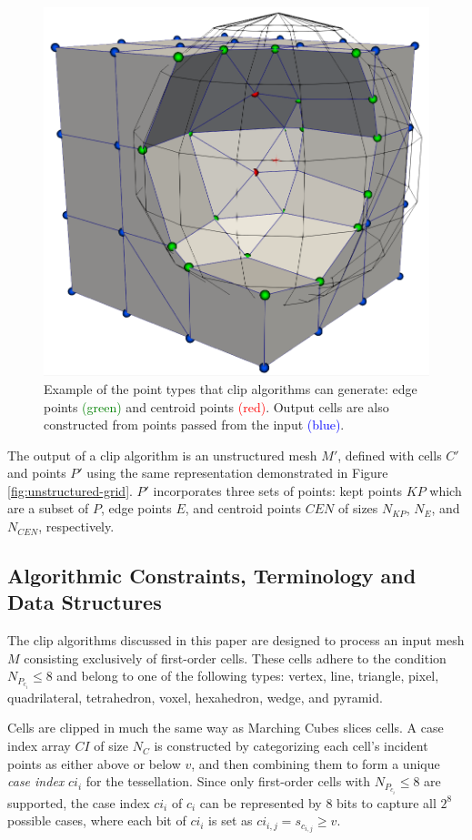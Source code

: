 \documentclass{egpubl}
\begin{document}
\begin{figure}[h]
    \centering
    \includegraphics[width=0.555\linewidth]{./Figures/Point-Types.png}
    \caption{Example of the point types that clip algorithms can generate: edge points \textcolor{green}{(green)} and centroid points \textcolor{red}{(red)}.
    Output cells are also constructed from points passed from the input \textcolor{blue}{(blue)}.}
    \label{fig:point-types}
\end{figure}

The output of a clip algorithm is an unstructured mesh $M'$, defined with cells $C'$ and points $P'$ using the same representation demonstrated in Figure \ref{fig:unstructured-grid}. $P'$ incorporates three sets of points: kept points $KP$ which are a subset of $P$, edge points $E$, and centroid points $CEN$ of sizes $N_{KP}$, $N_E$, and $N_{CEN}$, respectively.

\subsection{Algorithmic Constraints, Terminology and Data Structures}
\label{sec:constrains-terminology-data-structures}

The clip algorithms discussed in this paper are designed to process an input mesh $M$ consisting exclusively of first-order cells. These cells adhere to the condition $N_{P_{c_i}}\leq 8$ and belong to one of the following types: vertex, line, triangle, pixel, quadrilateral, tetrahedron, voxel, hexahedron, wedge, and pyramid.

Cells are clipped in much the same way as Marching Cubes \cite{MC} slices cells. A case index array $CI$ of size $N_C$ is constructed by categorizing each cell's incident points as either above or below $v$, and then combining them to form a unique \emph{case index} $ci_i$ for the tessellation. Since only first-order cells with $N_{P_{c_i}}\leq 8$ are supported, the case index $ci_i$ of $c_i$ can be represented by $8$ bits to capture all $2^8$ possible cases, where each bit of $ci_i$ is set as $ci_{i,j} = s_{c_{i,j}} \ge v$.
\end{document}
